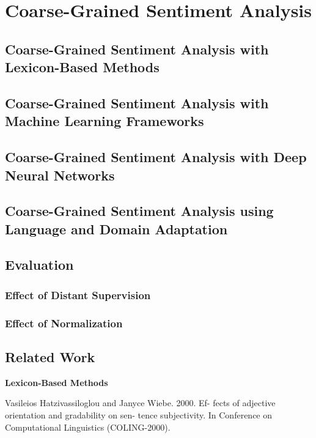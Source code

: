 \chapter{Coarse-Grained Sentiment Analysis}\label{sec:snt:cgsa}

\section{Coarse-Grained Sentiment Analysis with Lexicon-Based Methods}

\section{Coarse-Grained Sentiment Analysis with Machine Learning
  Frameworks}

\section{Coarse-Grained Sentiment Analysis with Deep Neural Networks}

\section{Coarse-Grained Sentiment Analysis using Language and Domain
  Adaptation}

\section{Evaluation}
\subsection{Effect of Distant Supervision}
\subsection{Effect of Normalization}

\section{Related Work}

\textbf{Lexicon-Based Methods}

Vasileios Hatzivassiloglou and Janyce Wiebe. 2000. Ef- fects of
adjective orientation and gradability on sen- tence subjectivity. In
Conference on Computational Linguistics (COLING-2000).




